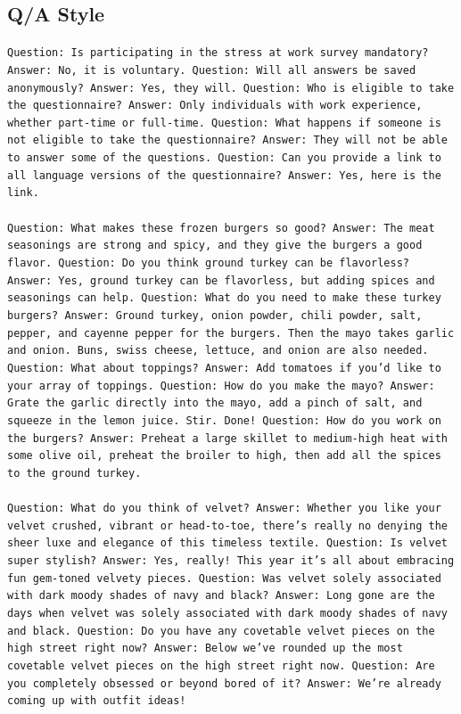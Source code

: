 \documentclass[table]{article}
\begin{document}
\subsection*{Q/A Style}
\begin{tcolorbox}[colback=gray!20, colframe=gray!75, rounded corners, sharp corners=northeast, sharp corners=southwest]
\texttt{Question: Is participating in the stress at work survey mandatory? Answer: No, it is voluntary. Question: Will all answers be saved anonymously? Answer: Yes, they will. Question: Who is eligible to take the questionnaire? Answer: Only individuals with work experience, whether part-time or full-time. Question: What happens if someone is not eligible to take the questionnaire? Answer: They will not be able to answer some of the questions. Question: Can you provide a link to all language versions of the questionnaire? Answer: Yes, here is the link.\\\\
Question: What makes these frozen burgers so good? Answer: The meat seasonings are strong and spicy, and they give the burgers a good flavor. Question: Do you think ground turkey can be flavorless? Answer: Yes, ground turkey can be flavorless, but adding spices and seasonings can help. Question: What do you need to make these turkey burgers? Answer: Ground turkey, onion powder, chili powder, salt, pepper, and cayenne pepper for the burgers. Then the mayo takes garlic and onion. Buns, swiss cheese, lettuce, and onion are also needed. Question: What about toppings? Answer: Add tomatoes if you'd like to your array of toppings. Question: How do you make the mayo? Answer: Grate the garlic directly into the mayo, add a pinch of salt, and squeeze in the lemon juice. Stir. Done! Question: How do you work on the burgers? Answer: Preheat a large skillet to medium-high heat with some olive oil, preheat the broiler to high, then add all the spices to the ground turkey.\\\\
Question: What do you think of velvet? Answer: Whether you like your velvet crushed, vibrant or head-to-toe, there's really no denying the sheer luxe and elegance of this timeless textile. Question: Is velvet super stylish? Answer: Yes, really! This year it's all about embracing fun gem-toned velvety pieces. Question: Was velvet solely associated with dark moody shades of navy and black? Answer: Long gone are the days when velvet was solely associated with dark moody shades of navy and black. Question: Do you have any covetable velvet pieces on the high street right now? Answer: Below we've rounded up the most covetable velvet pieces on the high street right now. Question: Are you completely obsessed or beyond bored of it? Answer: We're already coming up with outfit ideas!\\\\
}
\end{tcolorbox}
\end{document}
